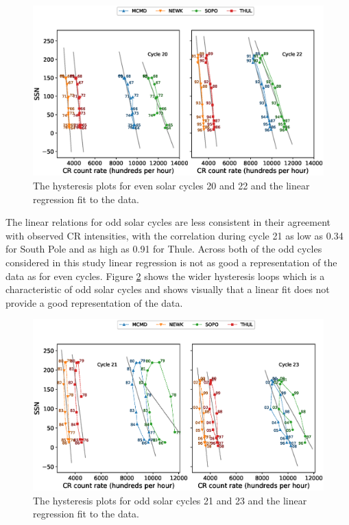 \begin{figure}
	\includegraphics[width=\columnwidth]{linear_even.eps}
	\caption{The hysteresis plots for even solar cycles 20 and 22 and the linear regression fit to the data.}
	\label{fig:linear_even}
\end{figure}

The linear relations for odd solar cycles are less consistent in their agreement with observed CR intensities, with the correlation during cycle 21 as low as 0.34 for South Pole and as high as 0.91 for Thule. Across both of the odd cycles considered in this study linear regression is not as good a representation  of the data as for even cycles. Figure \ref{fig:linear_odd} shows the wider hysteresis loops which is a characteristic of odd solar cycles and shows visually that a linear fit does not provide a good representation of the data. 

\begin{figure}
	\includegraphics[width=\columnwidth]{linear_odd.eps}
	\caption{The hysteresis plots for odd solar cycles 21 and 23 and the linear regression fit to the data.}
	\label{fig:linear_odd}
\end{figure}

